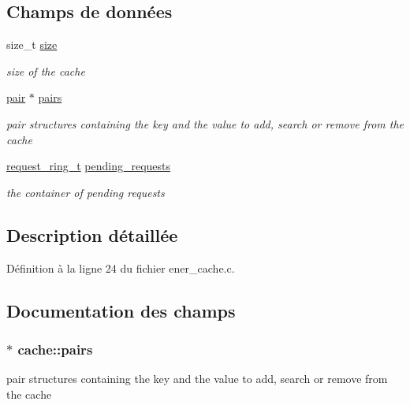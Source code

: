 \subsection*{Champs de données}
\begin{DoxyCompactItemize}
\item 
size\+\_\+t \hyperlink{structcache_a1887f2c37603f0e5229e6e4eab39405c}{size}
\begin{DoxyCompactList}\small\item\em size of the cache \end{DoxyCompactList}\item 
\hyperlink{structpair}{pair} $\ast$ \hyperlink{structcache_ac3666a01bc775349bf66e18eeff0494f}{pairs}
\begin{DoxyCompactList}\small\item\em pair structures containing the key and the value to add, search or remove from the cache \end{DoxyCompactList}\item 
\hyperlink{request__ring_8h_a9c9048435d4933efbc2ca98b08610cdd}{request\+\_\+ring\+\_\+t} \hyperlink{structcache_a265e519d03a385270d2757369e1993b8}{pending\+\_\+requests}
\begin{DoxyCompactList}\small\item\em the container of pending requests \end{DoxyCompactList}\end{DoxyCompactItemize}


\subsection{Description détaillée}


Définition à la ligne 24 du fichier ener\+\_\+cache.\+c.



\subsection{Documentation des champs}
\hypertarget{structcache_ac3666a01bc775349bf66e18eeff0494f}{
\subsubsection[{pairs}]{$\ast$ cache\+::pairs}}\label{structcache_ac3666a01bc775349bf66e18eeff0494f}


pair structures containing the key and the value to add, search or remove from the cache 



